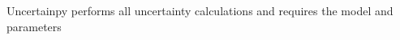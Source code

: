 \documentclass[presentation]{beamer}
\begin{document}

\begin{frame}{Uncertainpy performs all uncertainty calculations and requires the model and parameters}
  \begin{figure}
  \end{figure}
\end{frame}
\end{document}
